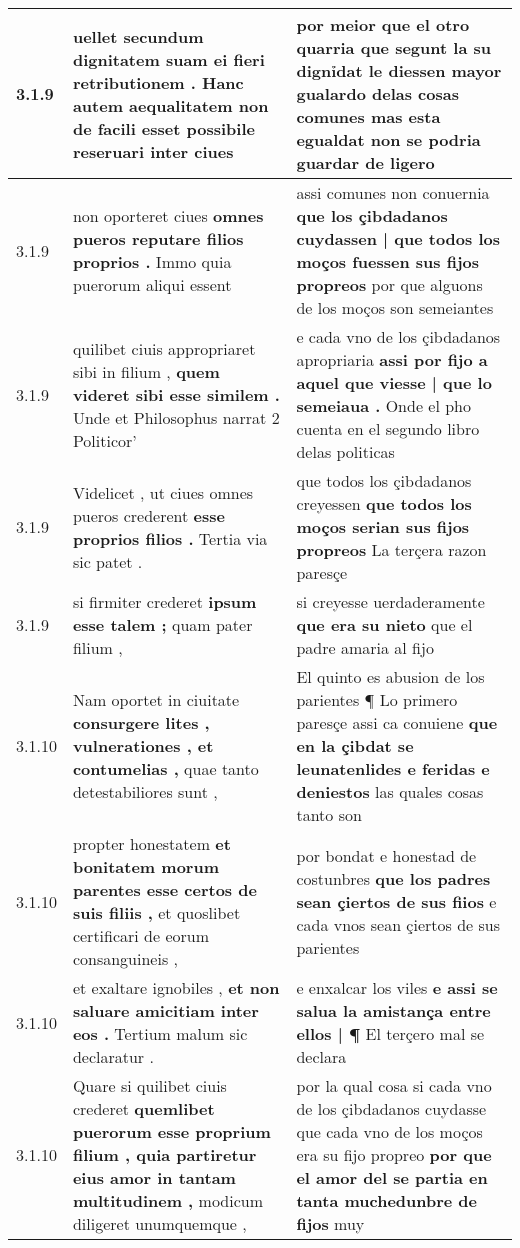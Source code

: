 \begin{tabular}{|p{1cm}|p{6.5cm}|p{6.5cm}|}
3.1.9 & uellet secundum dignitatem suam \textbf{ ei fieri retributionem . } Hanc autem aequalitatem non de facili esset possibile reseruari inter ciues & por meior que el otro quarria \textbf{ que segunt la su dignỉdat le diessen mayor gualardo delas cosas comunes } mas esta egualdat non se podria guardar de ligero \\\hline
3.1.9 & non oporteret ciues \textbf{ omnes pueros reputare filios proprios . } Immo quia puerorum aliqui essent & assi comunes non conuernia \textbf{ que los çibdadanos cuydassen | que todos los moços fuessen sus fijos propreos } por que alguons de los moços son semeiantes \\\hline
3.1.9 & quilibet ciuis appropriaret sibi in filium , \textbf{ quem videret sibi esse similem . } Unde et Philosophus narrat 2 Politicor’ & e cada vno de los çibdadanos apropriaria \textbf{ assi por fijo a aquel que viesse | que lo semeiaua . } Onde el pho cuenta en el segundo libro delas politicas \\\hline
3.1.9 & Videlicet , ut ciues omnes pueros crederent \textbf{ esse proprios filios . } Tertia via sic patet . & que todos los çibdadanos creyessen \textbf{ que todos los moços serian sus fijos propreos } La terçera razon paresçe \\\hline
3.1.9 & si firmiter crederet \textbf{ ipsum esse talem ; } quam pater filium , & si creyesse uerdaderamente \textbf{ que era su nieto } que el padre amaria al fijo \\\hline
3.1.10 & Nam oportet in ciuitate \textbf{ consurgere lites , vulnerationes , et contumelias , } quae tanto detestabiliores sunt , & El quinto es abusion de los parientes ¶ Lo primero paresçe assi ca conuiene \textbf{ que en la çibdat se leunatenlides e feridas e deniestos } las quales cosas tanto son \\\hline
3.1.10 & propter honestatem \textbf{ et bonitatem morum parentes esse certos de suis filiis , } et quoslibet certificari de eorum consanguineis , & por bondat e honestad de costunbres \textbf{ que los padres sean çiertos de sus fiios } e cada vnos sean çiertos de sus parientes \\\hline
3.1.10 & et exaltare ignobiles , \textbf{ et non saluare amicitiam inter eos . } Tertium malum sic declaratur . & e enxalcar los viles \textbf{ e assi se salua la amistança entre ellos | ¶ } El terçero mal se declara \\\hline
3.1.10 & Quare si quilibet ciuis crederet \textbf{ quemlibet puerorum esse proprium filium , quia partiretur eius amor in tantam multitudinem , } modicum diligeret unumquemque , & por la qual cosa si cada vno de los çibdadanos cuydasse que cada vno de los moços era su fijo propreo \textbf{ por que el amor del se partia en tanta muchedunbre de fijos } muy \\\hline

\end{tabular}
